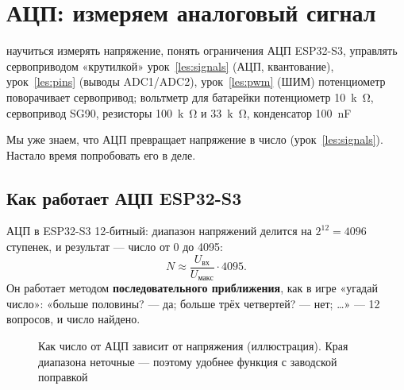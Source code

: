 \section{АЦП: измеряем аналоговый сигнал}
\label{les:adc}
\lessonintro
  {научиться измерять напряжение, понять ограничения АЦП ESP32-S3, управлять сервоприводом «крутилкой»}
  {урок~\ref{les:signals} (АЦП, квантование), урок~\ref{les:pins} (выводы ADC1/ADC2), урок~\ref{les:pwm} (ШИМ)}
  {потенциометр поворачивает сервопривод; вольтметр для батарейки}
  {потенциометр \SI{10}{k\ohm}, сервопривод SG90, резисторы \SI{100}{k\ohm} и \SI{33}{k\ohm}, конденсатор \SI{100}{nF}}

Мы уже знаем, что АЦП превращает напряжение в число (урок~\ref{les:signals}). Настало время
попробовать его в деле.

\subsection{Как работает АЦП ESP32-S3}

АЦП в ESP32-S3 12-битный: диапазон напряжений делится на $2^{12} = 4096$ ступенек, и результат ---
число от 0 до 4095:
\[
  N \approx \frac{U_\text{вх}}{U_\text{макс}} \cdot 4095 .
\]
Он работает методом \textbf{последовательного приближения}, как в игре «угадай число»: «больше
половины? --- да; больше трёх четвертей? --- нет; \ldots» --- 12 вопросов, и число найдено.

\begin{figure}[H]
\centering
{}
\caption{Как число от АЦП зависит от напряжения (иллюстрация). Края диапазона неточные ---
поэтому удобнее функция с заводской поправкой}
\end{figure}


